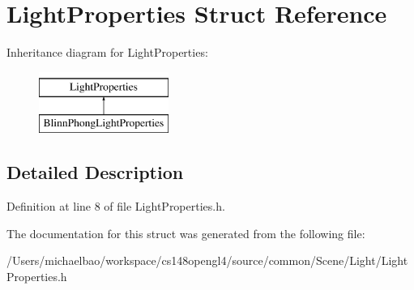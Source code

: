 \hypertarget{struct_light_properties}{}\section{Light\+Properties Struct Reference}
\label{struct_light_properties}
Inheritance diagram for Light\+Properties\+:\begin{figure}[H]
\begin{center}
\leavevmode
\includegraphics[height=2.000000cm]{struct_light_properties}
\end{center}
\end{figure}


\subsection{Detailed Description}


Definition at line 8 of file Light\+Properties.\+h.



The documentation for this struct was generated from the following file\+:\begin{DoxyCompactItemize}
\item 
/\+Users/michaelbao/workspace/cs148opengl4/source/common/\+Scene/\+Light/Light\+Properties.\+h\end{DoxyCompactItemize}
